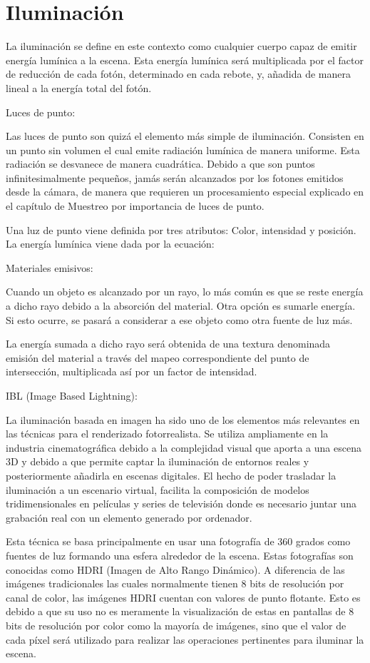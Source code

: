 	
	\section{Iluminación}
	
	La iluminación se define en este contexto como cualquier cuerpo capaz de emitir energía lumínica a la escena. Esta energía lumínica será multiplicada por el factor de reducción de cada fotón, determinado en cada rebote, y, añadida de manera lineal a la energía total del fotón.

	Luces de punto:

	Las luces de punto son quizá el elemento más simple de iluminación. Consisten en un punto sin volumen el cual emite radiación lumínica de manera uniforme. Esta radiación se desvanece de manera cuadrática. Debido a que son puntos infinitesimalmente pequeños, jamás serán alcanzados por los fotones emitidos desde la cámara, de manera que requieren un procesamiento especial explicado en el capítulo de Muestreo por importancia de luces de punto.

	Una luz de punto viene definida por tres atributos: Color, intensidad y posición. La energía lumínica viene dada por la ecuación:
	
	Materiales emisivos:

	Cuando un objeto es alcanzado por un rayo, lo más común es que se reste energía a dicho rayo debido a la absorción del material. Otra opción es sumarle energía. Si esto ocurre, se pasará a considerar a ese objeto como otra fuente de luz más.

	La energía sumada a dicho rayo será obtenida de una textura denominada emisión del material a través del mapeo correspondiente del punto de intersección, multiplicada así por un factor de intensidad.

	IBL (Image Based Lightning):

	La iluminación basada en imagen ha sido uno de los elementos más relevantes en las técnicas para el renderizado fotorrealista. Se utiliza ampliamente en la industria cinematográfica debido a la complejidad visual que aporta a una escena 3D y debido a que permite captar la iluminación de entornos reales y posteriormente añadirla en escenas digitales. El hecho de poder trasladar la iluminación a un escenario virtual, facilita la composición de modelos tridimensionales en películas y series de televisión donde es necesario juntar una grabación real con un elemento generado por ordenador.

	Esta técnica se basa principalmente en usar una fotografía de 360 grados como fuentes de luz formando una esfera alrededor de la escena. Estas fotografías son conocidas como HDRI (Imagen de Alto Rango Dinámico). A diferencia de las imágenes tradicionales las cuales normalmente tienen 8 bits de resolución por canal de color, las imágenes HDRI cuentan con valores de punto flotante. Esto es debido a que su uso no es meramente la visualización de estas en pantallas de 8 bits de resolución por color como la mayoría de imágenes, sino que el valor de cada píxel será utilizado para realizar las operaciones pertinentes para iluminar la escena.


